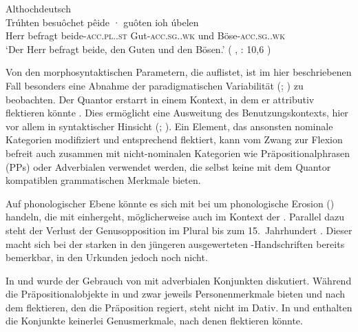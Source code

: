 \begin{exe}
\ex \label{ex:beidejohahd_2_copy}
	\langinfo%
		{Althochdeutsch}%
		{}%
		{\cite[35]{tax1979}}\\
	\gll Trúhten besuôchet pêide · guôten ioh úbelen \\
			Herr befragt beide-\textsc{acc.pl.\MascA.st} {}
				Gut-\textsc{acc.sg.\MascA.wk} und
				Böse-\textsc{acc.sg.\MascA.wk} \\
		\trans `Der Herr befragt beide, den Guten und den Bösen.'
			(%
				, : 10,6%
			)
\end{exe}

Von den morphosyntaktischen Parametern, die \citet[174]{lehmann2015} auflistet,
ist im hier beschriebenen Fall besonders eine Abnahme der
paradigmatischen Variabilität (;
\cite[146--150]{lehmann2015}) zu beobachten. Der Quantor erstarrt in einem
Kontext, in dem er attributiv flektieren könnte
. Dies ermöglicht eine Ausweitung des Benutzungskontexts,
hier vor allem in syntaktischer Hinsicht (; \cite[150--151]{lehmann2015}). Ein Element, das ansonsten
nominale Kategorien modifiziert und entsprechend flektiert, kann vom Zwang zur
Flexion befreit auch zusammen mit nicht-nominalen Kategorien wie
Präpositionalphrasen (PPs) oder
Adverbialen verwendet werden, die selbst keine mit dem Quantor
kompatiblen grammatischen Merkmale bieten.

Auf phonologischer Ebene könnte es sich mit \citet[134--136]{lehmann2015} bei
 um phonologische Erosion () handeln,
die mit  einhergeht, möglicherweise auch im Kontext
der  \autocite[88--92]{braune2018}. Parallel dazu
steht der Verlust der Genusopposition im Plural
bis zum 15.~Jahrhundert
\autocites[203]{paul2007}[191--192]{reichmannwegera1993}. Dieser macht sich bei
der starken  in den jüngeren ausgewerteten
\KC{}-Handschriften bereits bemerkbar, in den Urkunden jedoch noch
nicht.

In  und 
wurde der Gebrauch von  mit adverbialen Konjunkten
diskutiert. Während die Präpositionalobjekte in  und
 zwar jeweils Personenmerkmale
bieten und nach dem  flektieren, den die Präposition regiert, steht
 nicht im Dativ. In  und
 enthalten die Konjunkte keinerlei
Genusmerkmale, nach denen  flektieren könnte.

